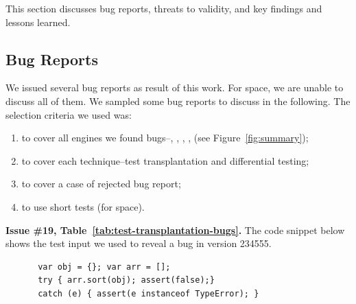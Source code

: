 \documentclass[smallextended]{svjour3}
\begin{document}

This section discusses bug reports, threats to validity, and key
findings and lessons learned.

\subsection{Bug Reports}

We issued several bug reports as result of this work. For space, we
are unable to discuss all of them. We sampled some bug reports to
discuss in the following. The selection criteria we used was:
\begin{enumerate}
\item to cover all engines we found bugs--\chakra, \hermes, \jsc,
  \smonkey, \veight (see Figure~\ref{fig:summary});
\item to cover each technique--test transplantation and differential
  testing;
\item to cover a case of rejected bug report;
\item to use short tests (for space).
\end{enumerate}


\sloppy

\vspace{1ex}\noindent\textbf{Issue \#19,
  Table~\ref{tab:test-transplantation-bugs}.} The code snippet below
shows the test input we used to reveal a bug in \textbf{\jsc} version 234555.

\begin{figure}[h!]
  \vspace{-0.5ex}
  \centering
  \scriptsize
  \begin{lstlisting}
 var obj = {}; var arr = [];
 try { arr.sort(obj); assert(false);}
 catch (e) { assert(e instanceof TypeError); }
  \end{lstlisting}
  \normalsize
  \vspace{-1ex}
\end{figure}
\end{document}
